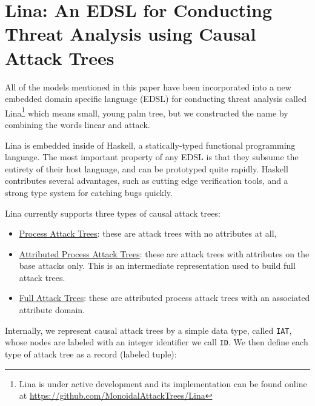 \documentclass{llncs}
\begin{document}

\vspace{-7px}
\section{Lina: An EDSL for Conducting Threat Analysis using Causal Attack Trees}
\label{sec:lina:_an_edsl_for_conducting_threat_analysis_using_causal_attack_trees}
All of the models mentioned in this paper have been incorporated into
a new embedded domain specific language (EDSL) for conducting threat
analysis called Lina\footnote{Lina is under active development and its
  implementation can be found online at
  \url{https://github.com/MonoidalAttackTrees/Lina}} which means
small, young palm tree, but we constructed the name by combining the
words linear and attack.
 
Lina is embedded inside of Haskell, a statically-typed functional
programming language.  The most important property of any EDSL is that
they subsume the entirety of their host language, and can be
prototyped quite rapidly.  Haskell contributes several advantages,
such as cutting edge verification tools, and a strong type system for
catching bugs quickly.  

Lina currently supports three types of causal attack trees:
\begin{itemize}
\item \underline{Process Attack Trees}: these are attack trees with no attributes
  at all,
  
\item \underline{Attributed Process Attack Trees}: these are attack trees with
  attributes on the base attacks only.  This is an intermediate
  representation used to build full attack trees.
  
\item \underline{Full Attack Trees}: these are attributed process attack trees
  with an associated attribute domain.
\end{itemize}
\newcommand{\mh}[1]{\texttt{#1}} Internally, we represent
causal attack trees by a simple data type, called \mh{IAT}, whose
nodes are labeled with an integer identifier we call \mh{ID}.  We then
define each type of attack tree as a record (labeled tuple):
\end{document}

